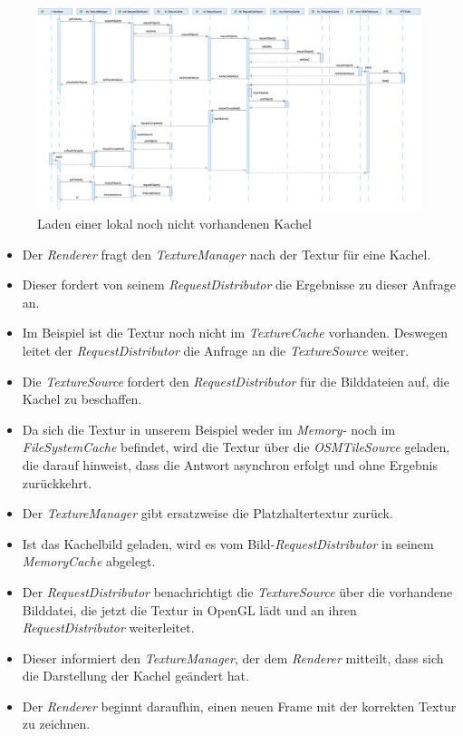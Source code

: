 \documentclass[10pt]{scrreprt}
\begin{document}
\vspace*{5mm}
\begin{figure}[h]
\begin{center}
\includegraphics[scale=0.28]{sequenz-osmtile.eps}
\caption{Laden einer lokal noch nicht vorhandenen Kachel}
\end{center}
\end{figure}

\begin{itemize}
\item Der \textit{Renderer} fragt den \textit{TextureManager} nach der Textur für eine Kachel.
\item Dieser fordert von seinem \textit{RequestDistributor} die Ergebnisse zu dieser Anfrage an.
\item Im Beispiel ist die Textur noch nicht im \textit{TextureCache} vorhanden. Deswegen leitet der \textit{RequestDistributor} die Anfrage an die \textit{TextureSource} weiter.
\item Die \textit{TextureSource} fordert den \textit{RequestDistributor} für die Bilddateien auf, die Kachel zu beschaffen.
\item Da sich die Textur in unserem Beispiel weder im \textit{Memory-} noch im \textit{FileSystemCache} befindet, wird die Textur über die \textit{OSMTileSource} geladen, die darauf hinweist, dass die Antwort asynchron erfolgt und ohne Ergebnis zurückkehrt.
\item Der \textit{TextureManager} gibt ersatzweise die Platzhaltertextur zurück.
\item Ist das Kachelbild geladen, wird es vom Bild-\textit{RequestDistributor} in seinem \textit{MemoryCache} abgelegt.
\item Der \textit{RequestDistributor} benachrichtigt die \textit{TextureSource} über die vorhandene Bilddatei, die jetzt die Textur in OpenGL lädt und an ihren \textit{RequestDistributor} weiterleitet.
\item Dieser informiert den \textit{TextureManager}, der dem \textit{Renderer} mitteilt, dass sich die Darstellung der Kachel geändert hat.
\item Der \textit{Renderer} beginnt daraufhin, einen neuen Frame mit der korrekten Textur zu zeichnen.
\end{itemize}
\end{document}

